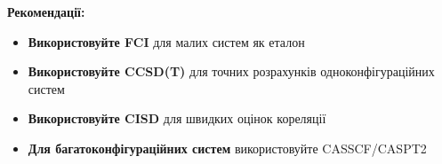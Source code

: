 \textbf{Рекомендації:}
\begin{itemize}
    \item \textbf{Використовуйте FCI} для малих систем як еталон
    \item \textbf{Використовуйте CCSD(T)} для точних розрахунків одноконфігураційних систем
    \item \textbf{Використовуйте CISD} для швидких оцінок кореляції
    \item \textbf{Для багатоконфігураційних систем} використовуйте CASSCF/CASPT2
\end{itemize}